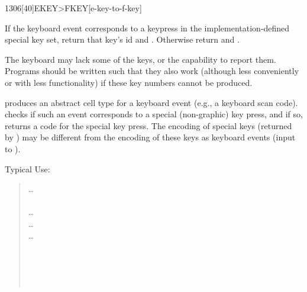 \vspace*{-2ex}
\begin{worddef}[EKEYtoFKEY]{1306}[40]{EKEY>FKEY}[e-key-to-f-key]%
\item {}

	If the keyboard event  corresponds to a keypress in the
	implementation-defined special key set, return that key's id
	 and . Otherwise return  and
	.

\note
	The keyboard may lack some of the keys, or the capability to report
	them. Programs should be written such that they also work (although
	less conveniently or with less functionality) if these key numbers
	cannot be produced.


	\begin{rationale} %
		 produces an abstract cell type for a keyboard
		event (e.g., a keyboard scan code).   checks
		if such an event corresponds to a special (non-graphic) key
		press, and if so, returns a code for the special key press.
		The encoding of special keys (returned by )
		may be different from the encoding of these keys as keyboard
		events (input to ).

		Typical Use:

		\begin{quote}
			{\ldots}    \\
			\tab {} \\
			\tab[2]   {\ldots}  \\
			\tab[2]   {\ldots}  \\
			\tab[2]   
			                       
			                     {\ldots}  \\
			\tab[2] {\ldots} \\
			\tab {} \\
			 \\
			\tab {\ldots} \\
		\end{quote}


\end{rationale}
\end{worddef}
